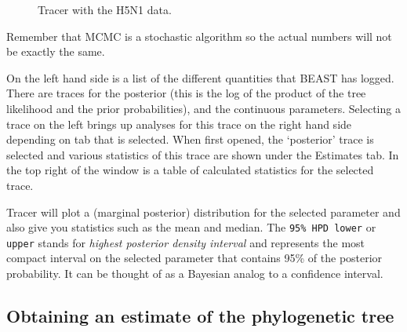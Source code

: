 \documentclass{article}
\begin{document}
\begin{figure}
\begin{center}


\end{center}
\caption{\label{fig.tracer} Tracer with the H5N1 data.}
\end{figure}


Remember that MCMC is a stochastic algorithm so the actual numbers will not be exactly the same.

On the left hand side is a list of the different quantities that BEAST has logged. There are traces for the posterior (this
is the log of the product of the tree likelihood and the prior probabilities), and the continuous parameters. Selecting a trace
on the left brings up analyses for this trace on the right hand side depending on tab that is selected. When first opened, the
`posterior' trace is selected and various statistics of this trace are shown under the Estimates tab.
In the top right of the window is a table of calculated statistics for the selected trace. 

Tracer will plot a (marginal posterior) distribution for the selected parameter and also give you statistics such as the mean and median. The \texttt{95\% HPD lower} or \texttt {upper} stands for {\it highest posterior density interval} and represents the most compact interval on the selected parameter that contains 95\% of the posterior probability. It can be thought of as a Bayesian analog to a confidence interval. 

\subsection*{Obtaining an estimate of the phylogenetic tree}
\end{document}
